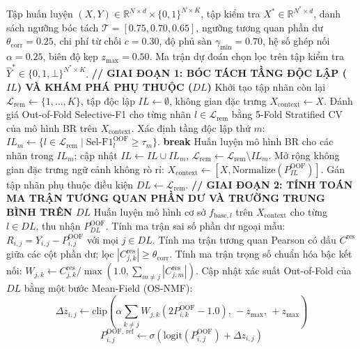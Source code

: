 \documentclass[10pt,a4paper,twoside]{article}
\begin{document}
\begin{algorithm}[H]
\caption{Quy trình Huấn luyện và Suy diễn Chọn lọc Toàn diện GSI-MLC-PA v6.3.2}
\label{alg:v632}
\begin{algorithmic}[1]
\Require Tập huấn luyện $(X, Y) \in \mathbb{R}^{N \times d} \times \{0, 1\}^{N \times K}$, tập kiểm tra $X^* \in \mathbb{R}^{N^* \times d}$, danh sách ngưỡng bóc tách $\mathcal{T} = [0.75, 0.70, 0.65]$, ngưỡng tương quan phần dư $\theta_{\text{corr}} = 0.25$, chi phí từ chối $c=0.30$, độ phủ sàn $\gamma_{\min}=0.70$, hệ số ghép nối $\alpha=0.25$, biên độ kẹp $z_{\max}=0.50$.
\Ensure Ma trận dự đoán chọn lọc trên tập kiểm tra $\hat{Y}^* \in \{0, 1, \bot\}^{N^* \times K}$.
\Statex \textbf{// GIAI ĐOẠN 1: BÓC TÁCH TẦNG ĐỘC LẬP ($IL$) VÀ KHÁM PHÁ PHỤ THUỘC ($DL$)}
\State Khởi tạo tập nhãn còn lại $\mathcal{L}_{\text{rem}} \gets \{1, \dots, K\}$, tập độc lập $IL \gets \emptyset$, không gian đặc trưng $X_{\text{context}} \gets X$.
    \State Đánh giá Out-of-Fold Selective-F1 cho từng nhãn $l \in \mathcal{L}_{\text{rem}}$ bằng 5-Fold Stratified CV của mô hình BR trên $X_{\text{context}}$.
    \State Xác định tầng độc lập thứ $m$: $IL_m \gets \{l \in \mathcal{L}_{\text{rem}} \mid \text{Sel-F1}_l^{\text{OOF}} \ge \tau_m\}$.
     \State \textbf{break} \EndIf
    \State Huấn luyện mô hình BR cho các nhãn trong $IL_m$; cập nhật $IL \gets IL \cup IL_m$, $\mathcal{L}_{\text{rem}} \gets \mathcal{L}_{\text{rem}} \setminus IL_m$.
    \State Mở rộng không gian đặc trưng ngữ cảnh không rò rỉ: $X_{\text{context}} \gets [X, \text{Normalize}(P^{\text{OOF}}_{IL})]$.
\EndFor
\State Gán tập nhãn phụ thuộc điều kiện $DL \gets \mathcal{L}_{\text{rem}}$.
\Statex \textbf{// GIAI ĐOẠN 2: TÍNH TOÁN MA TRẬN TƯƠNG QUAN PHẦN DƯ VÀ TRƯỜNG TRUNG BÌNH TRÊN $DL$}
\State Huấn luyện mô hình cơ sở $f_{\text{base}, l}$ trên $X_{\text{context}}$ cho từng $l \in DL$, thu nhận $P^{\text{OOF}}_{DL}$.
\State Tính ma trận sai số phần dư ngoại mẫu: $R_{i, j} = Y_{i, j} - P^{\text{OOF}}_{i, j}$ với mọi $j \in DL$.
\State Tính ma trận tương quan Pearson có dấu $C^{\text{res}}$ giữa các cột phần dư; lọc $|C^{\text{res}}_{j, k}| \ge \theta_{\text{corr}}$.
\State Tính ma trận trọng số chuẩn hóa bậc kết nối: $W_{j, k} \gets C^{\text{res}}_{j, k} / \max(1.0, \sum_{m \neq j} |C^{\text{res}}_{j, m}|)$.
\State Cập nhật xác suất Out-of-Fold của $DL$ bằng một bước Mean-Field (OS-NMF):
      $$\Delta z_{i, j} \gets \text{clip}\left(\alpha \sum_{k \neq j} W_{j, k} (2 P^{\text{OOF}}_{i, k} - 1.0), \, -z_{\max}, \, +z_{\max}\right)$$
      $$P^{\text{OOF, ref}}_{i, j} \gets \sigma(\text{logit}(P^{\text{OOF}}_{i, j}) + \Delta z_{i, j})$$

\end{algorithmic}
\end{algorithm}
\end{document}
